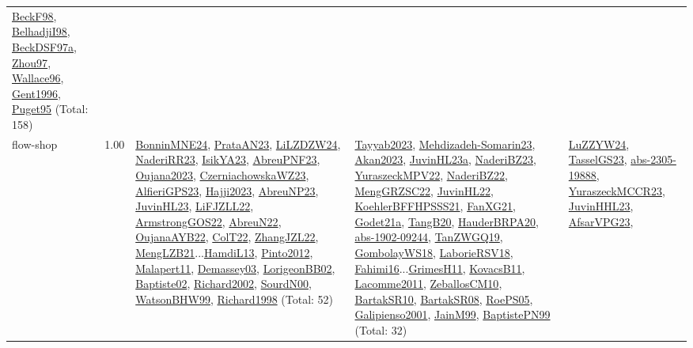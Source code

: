 {\begin{longtable}{p{3cm}r>{\raggedright\arraybackslash}p{6cm}>{\raggedright\arraybackslash}p{6cm}>{\raggedright\arraybackslash}p{8cm}}
\hyperref[detail:BeckF98]{BeckF98}, \hyperref[detail:BelhadjiI98]{BelhadjiI98}, \hyperref[detail:BeckDSF97a]{BeckDSF97a}, \hyperref[detail:Zhou97]{Zhou97}, \hyperref[detail:Wallace96]{Wallace96}, \hyperref[detail:Gent1996]{Gent1996}, \hyperref[detail:Puget95]{Puget95} (Total: 158)\\
\index{flow-shop}\index{Concepts!flow-shop}flow-shop &  1.00 & \hyperref[detail:BonninMNE24]{BonninMNE24}, \hyperref[detail:PrataAN23]{PrataAN23}, \hyperref[detail:LiLZDZW24]{LiLZDZW24}, \hyperref[detail:NaderiRR23]{NaderiRR23}, \hyperref[detail:IsikYA23]{IsikYA23}, \hyperref[detail:AbreuPNF23]{AbreuPNF23}, \hyperref[detail:Oujana2023]{Oujana2023}, \hyperref[detail:CzerniachowskaWZ23]{CzerniachowskaWZ23}, \hyperref[detail:AlfieriGPS23]{AlfieriGPS23}, \hyperref[detail:Hajji2023]{Hajji2023}, \hyperref[detail:AbreuNP23]{AbreuNP23}, \hyperref[detail:JuvinHL23]{JuvinHL23}, \hyperref[detail:LiFJZLL22]{LiFJZLL22}, \hyperref[detail:ArmstrongGOS22]{ArmstrongGOS22}, \hyperref[detail:AbreuN22]{AbreuN22}, \hyperref[detail:OujanaAYB22]{OujanaAYB22}, \hyperref[detail:ColT22]{ColT22}, \hyperref[detail:ZhangJZL22]{ZhangJZL22}, \hyperref[detail:MengLZB21]{MengLZB21}...\hyperref[detail:HamdiL13]{HamdiL13}, \hyperref[detail:Pinto2012]{Pinto2012}, \hyperref[detail:Malapert11]{Malapert11}, \hyperref[detail:Demassey03]{Demassey03}, \hyperref[detail:LorigeonBB02]{LorigeonBB02}, \hyperref[detail:Baptiste02]{Baptiste02}, \hyperref[detail:Richard2002]{Richard2002}, \hyperref[detail:SourdN00]{SourdN00}, \hyperref[detail:WatsonBHW99]{WatsonBHW99}, \hyperref[detail:Richard1998]{Richard1998} (Total: 52) & \hyperref[detail:Tayyab2023]{Tayyab2023}, \hyperref[detail:Mehdizadeh-Somarin23]{Mehdizadeh-Somarin23}, \hyperref[detail:Akan2023]{Akan2023}, \hyperref[detail:JuvinHL23a]{JuvinHL23a}, \hyperref[detail:NaderiBZ23]{NaderiBZ23}, \hyperref[detail:YuraszeckMPV22]{YuraszeckMPV22}, \hyperref[detail:NaderiBZ22]{NaderiBZ22}, \hyperref[detail:MengGRZSC22]{MengGRZSC22}, \hyperref[detail:JuvinHL22]{JuvinHL22}, \hyperref[detail:KoehlerBFFHPSSS21]{KoehlerBFFHPSSS21}, \hyperref[detail:FanXG21]{FanXG21}, \hyperref[detail:Godet21a]{Godet21a}, \hyperref[detail:TangB20]{TangB20}, \hyperref[detail:HauderBRPA20]{HauderBRPA20}, \hyperref[detail:abs-1902-09244]{abs-1902-09244}, \hyperref[detail:TanZWGQ19]{TanZWGQ19}, \hyperref[detail:GombolayWS18]{GombolayWS18}, \hyperref[detail:LaborieRSV18]{LaborieRSV18}, \hyperref[detail:Fahimi16]{Fahimi16}...\hyperref[detail:GrimesH11]{GrimesH11}, \hyperref[detail:KovacsB11]{KovacsB11}, \hyperref[detail:Lacomme2011]{Lacomme2011}, \hyperref[detail:ZeballosCM10]{ZeballosCM10}, \hyperref[detail:BartakSR10]{BartakSR10}, \hyperref[detail:BartakSR08]{BartakSR08}, \hyperref[detail:RoePS05]{RoePS05}, \hyperref[detail:Galipienso2001]{Galipienso2001}, \hyperref[detail:JainM99]{JainM99}, \hyperref[detail:BaptistePN99]{BaptistePN99} (Total: 32) & \hyperref[detail:LuZZYW24]{LuZZYW24}, \hyperref[detail:TasselGS23]{TasselGS23}, \hyperref[detail:abs-2305-19888]{abs-2305-19888}, \hyperref[detail:YuraszeckMCCR23]{YuraszeckMCCR23}, \hyperref[detail:JuvinHHL23]{JuvinHHL23}, \hyperref[detail:AfsarVPG23]{AfsarVPG23}, 
\end{longtable}}
